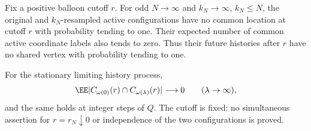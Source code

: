 \documentclass[11pt,letterpaper]{article}
\begin{document}
\begin{corollary}
\label{cor:late-disjointness}
Fix a positive balloon cutoff $r$. For odd $N\to\infty$ and
$k_N\to\infty$, $k_N\le N$, the original and $k_N$-resampled active
configurations have no common location at cutoff $r$ with probability
tending to one. Their expected number of common active coordinate
labels also tends to zero. Thus their future histories after $r$ have
no shared vertex with probability tending to one.

For the stationary limiting history process,
\[
 \EE|C_{\omega(0)}(r)\cap C_{\omega(\lambda)}(r)|
       \longrightarrow0\qquad(\lambda\to\infty),
\]
and the same holds at integer steps of $Q$.
The cutoff is fixed: no simultaneous assertion for $r=r_N\downarrow0$
or independence of the two configurations is proved.
\end{corollary}
\end{document}
